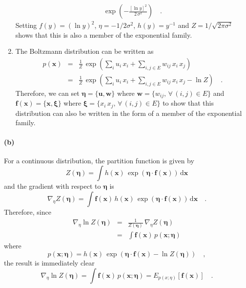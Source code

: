\documentclass[11pt]{article}
\newcommand{\pr}[1]{\ensuremath{p(#1)}}
\newcommand{\bvec}[1]{\ensuremath{\boldsymbol{#1}}}
\renewcommand{\vector}[1]{\bvec{#1}}
\newcommand{\dd}{\ensuremath{\, \mathrm{d}}}
\begin{document}
\begin{enumerate}
{\begin{eqnarray}
            \exp \left ( -\frac{[\ln y]^2}{2 \, \sigma^2} \right ) \quad .
        \end{eqnarray}
        Setting $f(y) = (\ln y)^2$, $\eta = -1/2\sigma^2$, $h(y) = y^{-1}$
        and $Z = 1/\sqrt{2 \pi \sigma^2}$ shows that this is also a member of
        the exponential family.
    }
    \item{The Boltzmann distribution can be written as
        \begin{eqnarray}
            \pr{\vector{x}} &=& \frac{1}{Z} \, \exp \left (
                \sum_i u_i \, x_i + \sum_{i,j \in E} w_{ij} \, x_i\,x_j
            \right )\\
            &=& \frac{1}{Z} \, \exp \left (
                \sum_i u_i \, x_i + \sum_{i,j \in E} w_{ij} \, x_i\,x_j
                -\ln Z
            \right ) \quad .
        \end{eqnarray}
        Therefore, we can set $\vector{\eta} = \{\vector{u}, \vector{w}\}$
        where $\vector{w} = \{w_{ij}, \, \forall\, (i,j) \in E\}$ and
        $\vector{f} (\vector{x}) = \{\vector{x}, \vector{\xi}\}$ where
        $\vector{\xi} = \{x_i\,x_j, \, \forall\, (i,j) \in E\}$ to show
        that this distribution can also be written in the form of a member
        of the exponential family.
    }
\end{enumerate}

\paragraph{(b)} For a continuous distribution, the partition function is
given by
\begin{equation}
    Z(\vector{\eta}) = \int h(\vector{x}) \, \exp\left (
        \vector{\eta} \cdot \vector{f} (\vector{x})\right ) \dd \vector{x}
\end{equation}
and the gradient with respect to \vector{\eta} is
\begin{equation}
    \nabla_\eta  Z(\vector{\eta}) = \int \vector{f} (\vector{x})
        \, h(\vector{x}) \, \exp\left (
        \vector{\eta} \cdot \vector{f} (\vector{x})\right ) \dd \vector{x}
        \quad .
\end{equation}
Therefore, since
\begin{eqnarray}
    \nabla_\eta \ln Z(\vector{\eta}) &=& \frac{1}{Z(\vector{\eta})} \,
        \nabla_\eta  Z(\vector{\eta})\\
        &=& \int \vector{f}(\vector{x}) \, \pr{\vector{x}; \vector{\eta}}
\end{eqnarray}
where
\begin{equation}
    \pr{\vector{x}; \vector{\eta}} = h(\vector{x}) \, \exp \left (
        \vector{\eta} \cdot \vector{f}(\vector{x}) - \ln Z(\vector{\eta})
    \right ) \quad ,
\end{equation}
the result is immediately clear
\begin{equation}
    \nabla_\eta \ln Z(\vector{\eta})
        = \int \vector{f}(\vector{x}) \, \pr{\vector{x}; \vector{\eta}}
    = E_{\pr{x; \eta}} \left [ \vector{f} (\vector{x}) \right ] \quad .
\end{equation}
\end{document}
